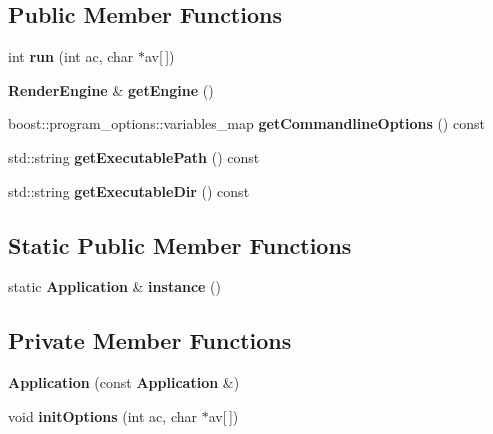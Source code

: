 \subsection*{Public Member Functions}
\begin{DoxyCompactItemize}
\item 
int {\bfseries run} (int ac, char $\ast$av[$\,$])\label{classsfs__visualizer_1_1Application_a5f172b387d5648986635a834671e15f7}

\item 
{\bf Render\-Engine} \& {\bfseries get\-Engine} ()\label{classsfs__visualizer_1_1Application_a1f03d282be02b67e743eb86c076905e3}

\item 
boost\-::program\-\_\-options\-::variables\-\_\-map {\bfseries get\-Commandline\-Options} () const \label{classsfs__visualizer_1_1Application_a2b70cdd8da81e2d73293b01c3125deae}

\item 
std\-::string {\bfseries get\-Executable\-Path} () const \label{classsfs__visualizer_1_1Application_a25a259c095c21540ba549cd8c0cb34ef}

\item 
std\-::string {\bfseries get\-Executable\-Dir} () const \label{classsfs__visualizer_1_1Application_a73d64fa96147de7b7b468b0e9fb19559}

\end{DoxyCompactItemize}
\subsection*{Static Public Member Functions}
\begin{DoxyCompactItemize}
\item 
static {\bf Application} \& {\bfseries instance} ()\label{classsfs__visualizer_1_1Application_ada3b7951bef34e1e6de30403eee8eada}

\end{DoxyCompactItemize}
\subsection*{Private Member Functions}
\begin{DoxyCompactItemize}
\item 
{\bfseries Application} (const {\bf Application} \&)\label{classsfs__visualizer_1_1Application_aae762bb7090da2e1db755d73f972c3be}

\item 
void {\bfseries init\-Options} (int ac, char $\ast$av[$\,$])\label{classsfs__visualizer_1_1Application_a6cf521cbce36f0ac4647470e53aaba40}

\end{DoxyCompactItemize}
